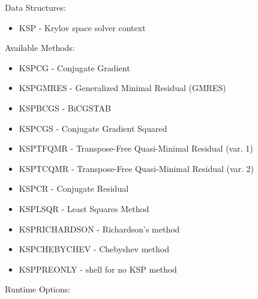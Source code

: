 \noindent
Data Structures:
\begin{itemize}
\item KSP - Krylov space solver context
\end{itemize}
Available Methods: 
\begin{itemize}
\item KSPCG - Conjugate Gradient
\item KSPGMRES - Generalized Minimal Residual (GMRES)
\item KSPBCGS - BiCGSTAB
\item KSPCGS - Conjugate Gradient Squared
\item KSPTFQMR - Transpose-Free Quasi-Minimal Residual (var. 1)
\item KSPTCQMR - Transpose-Free Quasi-Minimal Residual (var. 2)
\item KSPCR - Conjugate Residual
\item KSPLSQR - Least Squares Method
\item KSPRICHARDSON - Richardson's method
\item KSPCHEBYCHEV - Chebyshev method
\item KSPPREONLY - shell for no KSP method
\end{itemize}
Runtime Options:
